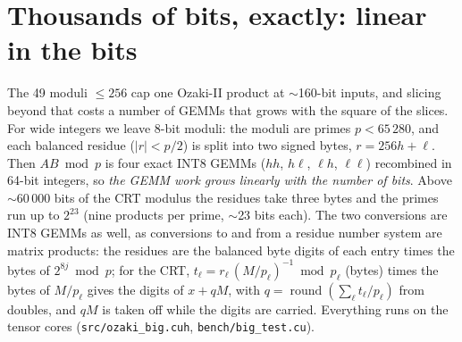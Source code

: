 \documentclass[11pt]{article}
\begin{document}
\section{Thousands of bits, exactly: linear in the bits}\label{sec:big}
The 49 moduli $\le 256$ cap one Ozaki-II product at $\sim$160-bit inputs, and slicing beyond that costs a number of GEMMs that
grows with the square of the slices. For wide integers we leave 8-bit moduli: the moduli are primes $p<65\,280$, and each
balanced residue ($|r|<p/2$) is split into two signed bytes, $r=256h+\ell$. Then $AB \bmod p$ is four exact INT8 GEMMs
($hh$, $h\ell$, $\ell h$, $\ell\ell$) recombined in 64-bit integers, so \emph{the GEMM work grows linearly with the number of
bits}. Above $\sim$60\,000 bits of the CRT modulus the residues take three bytes and the primes run up to $2^{23}$ (nine
products per prime, $\sim$23 bits each). The two conversions are INT8 GEMMs as well, as conversions to and from a residue
number system are matrix products: the residues are the balanced byte digits of each entry times the bytes of
$2^{8j} \bmod p$; for the CRT, $t_\ell = r_\ell\,(M/p_\ell)^{-1} \bmod p_\ell$ (bytes) times the bytes of $M/p_\ell$ gives the digits
of $x+qM$, with $q=\operatorname{round}(\sum_\ell t_\ell/p_\ell)$ from doubles, and $qM$ is taken off while the digits are
carried. Everything runs on the tensor cores (\texttt{src/ozaki\_big.cuh}, \texttt{bench/big\_test.cu}).
\end{document}
